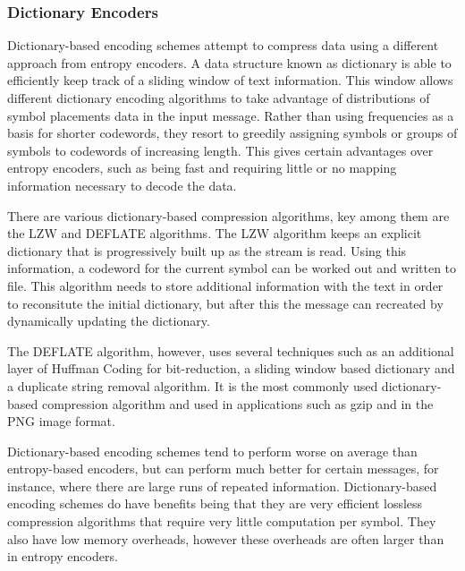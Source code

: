 \documentclass[a4paper,11pt]{report}
\begin{document}
\subsubsection*{Dictionary Encoders}

Dictionary-based encoding schemes attempt to compress data using a different approach from entropy encoders\cite{RefWorks:2}. A data structure known as dictionary is able to efficiently keep track of a sliding window of text information. This window allows different dictionary encoding algorithms to take advantage of distributions of symbol placements data in the input message. Rather than using frequencies as a basis for shorter codewords, they resort to greedily assigning symbols or groups of symbols to codewords of increasing length. This gives certain advantages over entropy encoders, such as being fast and requiring little or no mapping information necessary to decode the data. 

There are various dictionary-based compression algorithms, key among them are the LZW and DEFLATE algorithms. The LZW algorithm keeps an explicit dictionary that is progressively built up as the stream is read.\cite{1320134} Using this information, a codeword for the current symbol can be worked out and written to file. This algorithm needs to store additional information with the text in order to reconsitute the initial dictionary, but after this the message can recreated by dynamically updating the dictionary. 

The DEFLATE algorithm, however, uses several techniques such as an additional layer of Huffman Coding for bit-reduction, a sliding window based dictionary and a duplicate string removal algorithm\cite{deflaterfc}. It is the most commonly used dictionary-based compression algorithm and used in applications such as gzip and in the PNG image format. 

Dictionary-based encoding schemes tend to perform worse on average than entropy-based encoders, but can perform much better for certain messages, for instance, where there are large runs of repeated information. Dictionary-based encoding schemes do have benefits being that they are very efficient lossless compression algorithms that require very little computation per symbol. They also have low memory overheads, however these overheads are often larger than in entropy encoders. 
\end{document}

